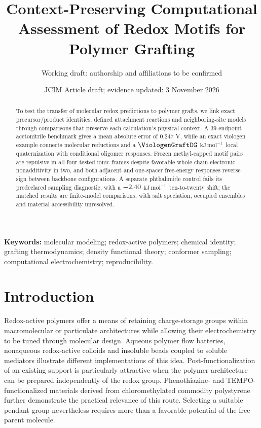 \documentclass[11pt]{article}
\title{Context-Preserving Computational Assessment of Redox Motifs for Polymer Grafting}
\author{Working draft: authorship and affiliations to be confirmed}
\date{JCIM Article draft; evidence updated: 3 November 2026}
\newcommand{\kj}{\ensuremath{\mathrm{kJ\,mol^{-1}}}}
\begin{document}
\maketitle

\begin{abstract}
To test the transfer of molecular redox predictions to polymer grafts, we link exact precursor/product identities, defined attachment reactions and neighboring-site models through comparisons that preserve each calculation's physical context. A 39-endpoint acetonitrile benchmark gives a mean absolute error of 0.247 V, while an exact viologen example connects molecular reductions and a $\ViologenGraftDG$ \kj\ local quaternization with conditional oligomer responses. Frozen methyl-capped motif pairs are repulsive in all four tested ionic frames despite favorable whole-chain electronic nonadditivity in two, and both adjacent and one-spacer free-energy responses reverse sign between backbone configurations. A separate phthalimide control fails its predeclared sampling diagnostic, with a $-2.40$ \kj\ ten-to-twenty shift; the matched results are finite-model comparisons, with salt speciation, occupied ensembles and material accessibility unresolved.
\end{abstract}
\noindent\textbf{Keywords:} molecular modeling; redox-active polymers; chemical identity; grafting thermodynamics; density functional theory; conformer sampling; computational electrochemistry; reproducibility.

\section{Introduction}
Redox-active polymers offer a means of retaining charge-storage groups within macromolecular or particulate architectures while allowing their electrochemistry to be tuned through molecular design. Aqueous polymer flow batteries, nonaqueous redox-active colloids and insoluble beads coupled to soluble mediators illustrate different implementations of this idea.\cite{janoschka2015,montoto2016,kim2022} Post-functionalization of an existing support is particularly attractive when the polymer architecture can be prepared independently of the redox group. Phenothiazine- and TEMPO-functionalized materials derived from chloromethylated commodity polystyrene further demonstrate the practical relevance of this route.\cite{ohbiying2025upcycling} Selecting a suitable pendant group nevertheless requires more than a favorable potential of the free parent molecule.
\end{document}
